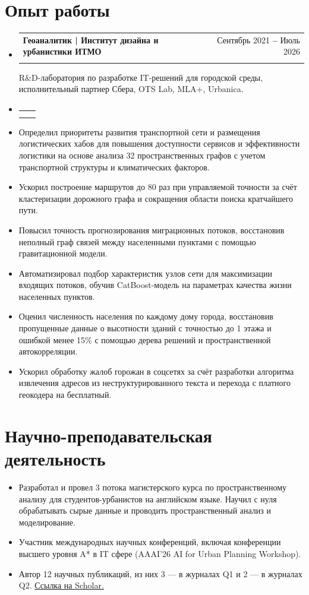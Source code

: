 \documentclass[letterpaper,11pt]{article}
\makeatletter
\newcommand{\resumeSubheading}[4]{
  \vspace{-2pt}\item
    \begin{tabular*}{0.97\textwidth}[t]{l@{\extracolsep{\fill}}r}
      \textbf{#1} & #2 \\
      \textit{\small#3} & \textit{\small #4} \\
    \end{tabular*}\vspace{-7pt}
}
\newcommand{\resumeSubHeadingListStart}{\begin{itemize}[leftmargin=0.15in, label={}, topsep=0pt, itemsep=0pt, parsep=0pt, partopsep=0pt]}
\newcommand{\resumeSubHeadingListEnd}{\end{itemize}}
\newcommand{\resumeBulletListStart}{\begin{itemize}[leftmargin=0.22in, label={--}, topsep=2pt, itemsep=2pt, parsep=0pt, partopsep=0pt]}
\newcommand{\resumeBulletListEnd}{\end{itemize}}
\makeatother
\begin{document}

\section{Опыт работы}
  \vspace{2pt}
  \resumeSubHeadingListStart
  \resumeSubheading
      {Геоаналитик | Институт дизайна и урбанистики ИТМО}{Сентябрь 2021 \textbf{--} Июль 2026}
      {}{}

  R\&D-лаборатория по разработке IT-решений для городской среды, исполнительный партнер Сбера, OTS Lab, MLA+, Urbanica.

  \resumeSubheading
      {}{}{}{}
  \resumeSubHeadingListEnd
  \resumeBulletListStart
      \item Определил приоритеты развития транспортной сети и размещения логистических хабов для повышения доступности сервисов и эффективности логистики на основе анализа 32 пространственных графов с учетом транспортной структуры и климатических факторов.
      \item Ускорил построение маршрутов до 80 раз при управляемой точности за счёт кластеризации дорожного графа и сокращения области поиска кратчайшего пути.
      \item Повысил точность прогнозирования миграционных потоков, восстановив неполный граф связей между населенными пунктами с помощью гравитационной модели.
      \item Автоматизировал подбор характеристик узлов сети для максимизации входящих потоков, обучив CatBoost-модель на параметрах качества жизни населенных пунктов.
      \item Оценил численность населения по каждому дому города, восстановив пропущенные данные о высотности зданий с точностью до 1 этажа и ошибкой менее 15\% с помощью дерева решений и пространственной автокорреляции.
      \item Ускорил обработку жалоб горожан в соцсетях за счёт разработки алгоритма извлечения адресов из неструктурированного текста и перехода с платного геокодера на бесплатный.
  \resumeBulletListEnd


\section{Научно-преподавательская деятельность}
  \vspace{2pt}
  \resumeBulletListStart
    \item Разработал и провел 3 потока магистерского курса по пространственному анализу для студентов-урбанистов на английском языке. Научил с нуля обрабатывать сырые данные и проводить пространственный анализ и моделирование.
    \item Участник международных научных конференций, включая конференции высшего уровня A* в IT сфере (AAAI'26 AI for Urban Planning Workshop).
    \item Автор 12 научных публикаций, из них 3 — в журналах Q1 и 2 — в журналах Q2. \href{https://scholar.google.com/citations?user=S--bTg8AAAAJ&hl=ru}{Ссылка на Scholar.}
  \resumeBulletListEnd
\end{document}
